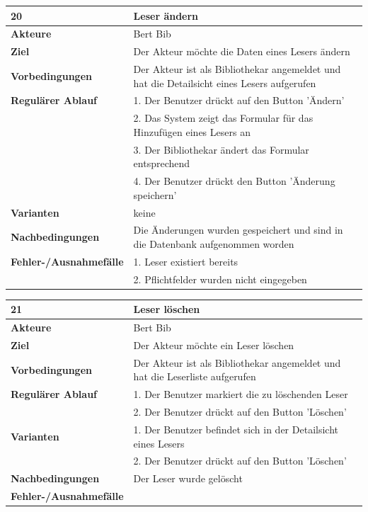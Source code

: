 \documentclass[fontsize=12pt,paper=a4,twoside]{scrartcl}
\begin{document}
\begin{table}[htbp]
\label{20}
\begin{tabular}{|l|p{10cm}|}
\hline 
\textbf{20} & \textbf{Leser ändern} \\ \hline
\textbf{Akteure} & Bert Bib\\ \hline
\textbf{Ziel} & Der Akteur möchte die Daten eines Lesers ändern \\ \hline
\textbf{Vorbedingungen} & Der Akteur ist als Bibliothekar angemeldet und hat die Detailsicht eines 
Lesers aufgerufen  \\ \hline
\textbf{Regulärer Ablauf} & 
1. Der Benutzer drückt auf den Button 'Ändern' \\
&2. Das System zeigt das Formular für das Hinzufügen eines Lesers an\\
&3. Der Bibliothekar ändert das Formular entsprechend\\
&4. Der Benutzer drückt den Button 'Änderung speichern'\\
\hline
\textbf{Varianten} & 
keine \\ \hline
\textbf{Nachbedingungen} & Die Änderungen wurden gespeichert und sind in die Datenbank 
aufgenommen worden\\ \hline
\textbf{Fehler-/Ausnahmefälle} & 1. Leser existiert bereits\\
&2. Pflichtfelder wurden nicht eingegeben\\
\hline
\end{tabular}
\end{table}

\begin{table}[htbp]
\label{21}
\begin{tabular}{|l|p{10cm}|}
\hline 
\textbf{21} & \textbf{Leser löschen} \\ \hline
\textbf{Akteure} & Bert Bib\\ \hline
\textbf{Ziel} & Der Akteur möchte ein Leser löschen \\ \hline
\textbf{Vorbedingungen} & Der Akteur ist als Bibliothekar angemeldet und hat die Leserliste 
aufgerufen  \\ \hline
\textbf{Regulärer Ablauf} & 
1. Der Benutzer markiert die zu löschenden Leser\\
&2. Der Benutzer drückt auf den Button 'Löschen' \\
\hline
\textbf{Varianten} & 
1. Der Benutzer befindet sich in der Detailsicht eines Lesers\\
&2. Der Benutzer drückt auf den Button 'Löschen' \\ \hline
\textbf{Nachbedingungen} & Der Leser wurde gelöscht \\ \hline
\textbf{Fehler-/Ausnahmefälle} & \\
\hline
\end{tabular}
\end{table}
\end{document}
